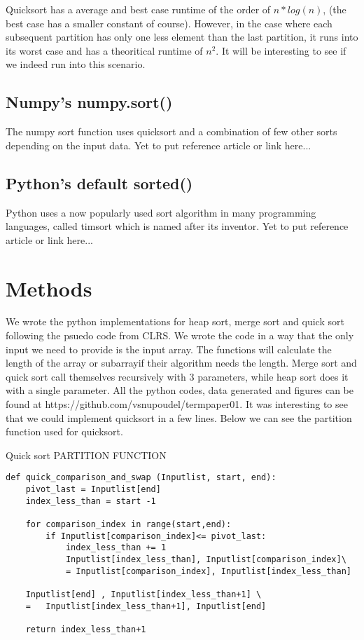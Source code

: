 \documentclass[sigconf, nonacm, natbib, screen, balance=False]{acmart}
\begin{document}
 Quicksort has a average and best case runtime of the order of $n*log(n)$, (the best case has a smaller constant of course).
 However, in the case where each subsequent partition has only one less element than the last partition, it runs
into its worst case and has a theoritical runtime of $n^2$. It will be interesting to see if we indeed run into this scenario.

\subsection{Numpy's numpy.sort()}\label{sec:numpy sort}
The numpy sort function uses quicksort and a combination of few other sorts depending on the input data. Yet to 
put reference article or link here...

\subsection{Python's default sorted()}\label{sec:sorted sort}
Python uses a now popularly used sort algorithm in many programming languages, called timsort which is named after its
inventor. Yet to put reference article or link here...

\section{Methods}\label{sec:methods}
We wrote the python implementations for heap sort, merge sort and quick sort following the psuedo code from CLRS. We wrote
the code in a way that the only input we need to provide is the input array. The functions will calculate the length of the array 
or subarrayif their algorithm needs the length. Merge sort and quick sort call themselves recursively with 3 parameters, while heap
sort does it with a single parameter. All the python codes, data generated and figures can be found at https://github.com/vsnupoudel/termpaper01.
It was interesting to see that we could implement quicksort in a few lines. Below we can see the partition function used for quicksort.

\begin{listing}
  \caption{Quick sort PARTITION FUNCTION}
  \label{lst:quick_partition}

\begin{verbatim}
def quick_comparison_and_swap (Inputlist, start, end): 
    pivot_last = Inputlist[end]
    index_less_than = start -1
    
    for comparison_index in range(start,end):
        if Inputlist[comparison_index]<= pivot_last:
            index_less_than += 1
            Inputlist[index_less_than], Inputlist[comparison_index]\
            = Inputlist[comparison_index], Inputlist[index_less_than]  
            
    Inputlist[end] , Inputlist[index_less_than+1] \
    =   Inputlist[index_less_than+1], Inputlist[end]  

    return index_less_than+1  
\end{verbatim}
\end{listing}
\end{document}
